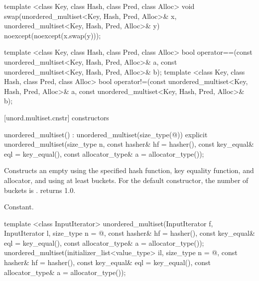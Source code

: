 \begin{codeblock}
{  template <class Key, class Hash, class Pred, class Alloc>
    void swap(unordered_multiset<Key, Hash, Pred, Alloc>& x,
              unordered_multiset<Key, Hash, Pred, Alloc>& y)
      noexcept(noexcept(x.swap(y)));

  template <class Key, class Hash, class Pred, class Alloc>
    bool operator==(const unordered_multiset<Key, Hash, Pred, Alloc>& a,
                    const unordered_multiset<Key, Hash, Pred, Alloc>& b);
  template <class Key, class Hash, class Pred, class Alloc>
    bool operator!=(const unordered_multiset<Key, Hash, Pred, Alloc>& a,
                    const unordered_multiset<Key, Hash, Pred, Alloc>& b);
}
\end{codeblock}

[unord.multiset.cnstr]{ constructors}

%
\begin{itemdecl}
unordered_multiset() : unordered_multiset(size_type(@\seebelow@)) { }
explicit unordered_multiset(size_type n,
                            const hasher& hf = hasher(),
                            const key_equal& eql = key_equal(),
                            const allocator_type& a = allocator_type());
\end{itemdecl}

\begin{itemdescr}
\pnum
\effects Constructs an empty  using the
specified hash function, key equality function, and allocator, and
using at least  buckets.  For the default constructor,
the number of buckets is .
 returns 1.0.

\pnum
\complexity Constant.
\end{itemdescr}

%
\begin{itemdecl}
template <class InputIterator>
  unordered_multiset(InputIterator f, InputIterator l,
                     size_type n = @\seebelow@,
                     const hasher& hf = hasher(),
                     const key_equal& eql = key_equal(),
                     const allocator_type& a = allocator_type());
unordered_multiset(initializer_list<value_type> il,
                   size_type n = @\seebelow@,
                   const hasher& hf = hasher(),
                   const key_equal& eql = key_equal(),
                   const allocator_type& a = allocator_type());
\end{itemdecl}

